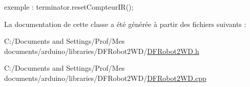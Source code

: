 exemple \-: terminator.\-reset\-Compteur\-I\-R(); 

La documentation de cette classe a été générée à partir des fichiers suivants \-:\begin{DoxyCompactItemize}
\item 
C\-:/\-Documents and Settings/\-Prof/\-Mes documents/arduino/libraries/\-D\-F\-Robot2\-W\-D/\hyperlink{_d_f_robot2_w_d_8h}{D\-F\-Robot2\-W\-D.\-h}\item 
C\-:/\-Documents and Settings/\-Prof/\-Mes documents/arduino/libraries/\-D\-F\-Robot2\-W\-D/\hyperlink{_d_f_robot2_w_d_8cpp}{D\-F\-Robot2\-W\-D.\-cpp}\end{DoxyCompactItemize}
